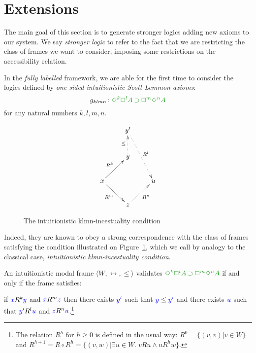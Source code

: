 \newcommand{\set}[1]{\{#1\}}

\section{Extensions}\label{sec:ext}

The main goal of this section is to generate stronger logics adding new axioms to our system. We say \emph{stronger logic} to refer to the fact that we are restricting the class of frames we want to consider, imposing some restrictions on the accessibility relation. 

In the \emph{fully labelled} framework, we are able for the first time to consider the logics defined by \emph{one-sided intuitionistic Scott-Lemmon axioms}:
\begin{equation}
\agklmn\colon\fm{\DIA^{k} \BOX^{l} A \IMP \BOX^{m}\DIA^{n} A}
\end{equation}
for any natural numbers $k,l,m,n$.

\begin{figure}
	$$
	\xymatrix{
		& y' \ar@{.>}[ddr]^{R^l} \\
		& y \ar@{.>}[u]^{\le} \\
		x \ar@{->}[ur]^{R^k}\ar@{->}[dr]_{R^m} && u \\
		& z \ar@{.>}[ur]_{R^n}
	}
	$$
	\caption{The intuitionistic klmn-incestuality condition}
	\label{fig:gklmn}
\end{figure}

Indeed, they are known to obey a strong correspondence with the class of frames satisfying the condition illustrated on Figure~\ref{fig:gklmn}, which we call by analogy to the classical case, \emph{intuitionistic klmn-incestuality condition}.

\begin{theorem}\label{thm:gklmn-correspondence}
	An intuitionistic modal frame $\langle W, \rel, \le \rangle$ validates $\fm{\DIA^k\BOX^l A \IMP \BOX^m\DIA^n A}$ if and only if the frame satisfies:
	
	if ${\color{blue}{x}} R^{k} {\color{blue}{y}}$ and ${\color{blue}{x}} R^{m} {\color{blue}{z}}$ then there exists ${\color{blue}{y'}}$ such that ${\color{blue}{y}}\le{{\color{blue}{y'}}}$ and there exists ${\color{blue}{u}}$ such that ${\color{blue}{y'}}R^{l}{\color{blue}{u}}$ and ${\color{blue}{z}} R^{n} {\color{blue}{u}}$.\footnote{The relation $R^h$ for $h\ge0$ is defined in the usual way: $R^0=\set{(v,v)|v\in W}$ and $R^{h+1}=R\circ R^h=\set{(v,w)|\exists u\in W.\; vRu \wedge uR^hw}$.}
\end{theorem}

